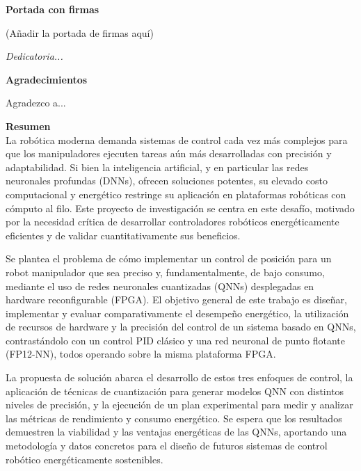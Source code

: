 \documentclass[12pt]{article}
\begin{document}
\newpage
\vspace*{5cm}
\begin{center}
    \Huge \textbf{Portada con firmas}
    
    (Añadir la portada de firmas aquí)
\end{center}

\newpage
\vspace*{5cm}
\begin{flushright}
    \Large \textit{Dedicatoria...}
\end{flushright}

\newpage
\vspace*{5cm}
\begin{center}
    \Large \textbf{Agradecimientos}
    
    Agradezco a...
\end{center}

\newpage
\tableofcontents

\newpage
{}
{\large \textbf{Resumen}}\\
La robótica moderna demanda sistemas de control cada vez más complejos para que los manipuladores ejecuten tareas aún más desarrolladas con precisión y adaptabilidad. Si bien la inteligencia artificial, y en particular las redes neuronales profundas (DNNs), ofrecen soluciones potentes, su elevado costo computacional y energético restringe su aplicación en plataformas robóticas con cómputo al filo. Este proyecto de investigación se centra en este desafío, motivado por la necesidad crítica de desarrollar controladores robóticos energéticamente eficientes y de validar cuantitativamente sus beneficios.

Se plantea el problema de cómo implementar un control de posición para un robot manipulador que sea preciso y, fundamentalmente, de bajo consumo, mediante el uso de redes neuronales cuantizadas (QNNs) desplegadas en hardware reconfigurable (FPGA). El objetivo general de este trabajo es diseñar, implementar y evaluar comparativamente el desempeño energético, la utilización de recursos de hardware y la precisión del control de un sistema basado en QNNs, contrastándolo con un control PID clásico y una red neuronal de punto flotante (FP12-NN), todos operando sobre la misma plataforma FPGA.

La propuesta de solución abarca el desarrollo de estos tres enfoques de control, la aplicación de técnicas de cuantización para generar modelos QNN con distintos niveles de precisión, y la ejecución de un plan experimental para medir y analizar las métricas de rendimiento y consumo energético. Se espera que los resultados demuestren la viabilidad y las ventajas energéticas de las QNNs, aportando una metodología y datos concretos para el diseño de futuros sistemas de control robótico energéticamente sostenibles.
\end{document}
